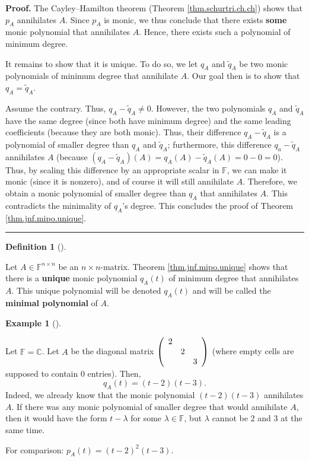 \documentclass[numbers=enddot,12pt,final,onecolumn,notitlepage]{scrartcl}%
\numberwithin{exer}{subsection}
\theoremstyle{definition}
\newtheorem{defi}[theo]{Definition}
\newenvironment{definition}[1][]
{\begin{defi}[#1]\begin{leftbar}}
{\end{leftbar}\end{defi}}
\newtheorem{exam}[theo]{Example}
\newenvironment{example}[1][]
{\begin{exam}[#1]\begin{leftbar}}
{\end{leftbar}\end{exam}}
\newenvironment{proof}[1][Proof]{\noindent\textbf{#1.} }{\ \rule{0.5em}{0.5em}}
\begin{document}
\begin{proof}
The Cayley--Hamilton theorem (Theorem \ref{thm.schurtri.ch.ch}) shows that
$p_{A}$ annihilates $A$. Since $p_{A}$ is monic, we thus conclude that there
exists \textbf{some} monic polynomial that annihilates $A$. Hence, there
exists such a polynomial of minimum degree.

It remains to show that it is unique. To do so, we let $q_{A}$ and
$\widetilde{q}_{A}$ be two monic polynomials of minimum degree that annihilate
$A$. Our goal then is to show that $q_{A}=\widetilde{q}_{A}$.

Assume the contrary. Thus, $q_{A}-\widetilde{q}_{A}\neq0$. However, the two
polynomials $q_{A}$ and $\widetilde{q}_{A}$ have the same degree (since both
have minimum degree) and the same leading coefficients (because they are both
monic). Thus, their difference $q_{A}-\widetilde{q}_{A}$ is a polynomial of
smaller degree than $q_{A}$ and $\widetilde{q}_{A}$; furthermore, this
difference $q_{a}-\widetilde{q}_{A}$ annihilates $A$ (because $\left(
q_{A}-\widetilde{q}_{A}\right)  \left(  A\right)  =q_{A}\left(  A\right)
-\widetilde{q}_{A}\left(  A\right)  =0-0=0$). Thus, by scaling this difference
by an appropriate scalar in $\mathbb{F}$, we can make it monic (since it is
nonzero), and of course it will still annihilate $A$. Therefore, we obtain a
monic polynomial of smaller degree than $q_{A}$ that annihilates $A$. This
contradicts the minimality of $q_{A}$'s degree. This concludes the proof of
Theorem \ref{thm.jnf.mipo.unique}.
\end{proof}

\begin{definition}
\label{def.jnf.mipo.mipo}Let $A\in\mathbb{F}^{n\times n}$ be an $n\times
n$-matrix. Theorem \ref{thm.jnf.mipo.unique} shows that there is a
\textbf{unique} monic polynomial $q_{A}\left(  t\right)  $ of minimum degree
that annihilates $A$. This unique polynomial will be denoted $q_{A}\left(
t\right)  $ and will be called the \textbf{minimal polynomial} of $A$.
\end{definition}

\begin{example}
Let $\mathbb{F}=\mathbb{C}$. Let $A$ be the diagonal matrix $\left(
\begin{array}
[c]{ccc}%
2 &  & \\
& 2 & \\
&  & 3
\end{array}
\right)  $ (where empty cells are supposed to contain $0$ entries). Then,%
\[
q_{A}\left(  t\right)  =\left(  t-2\right)  \left(  t-3\right)  .
\]
Indeed, we already know that the monic polynomial $\left(  t-2\right)  \left(
t-3\right)  $ annihilates $A$. If there was any monic polynomial of smaller
degree that would annihilate $A$, then it would have the form $t-\lambda$ for
some $\lambda\in\mathbb{F}$, but $\lambda$ cannot be $2$ and $3$ at the same time.

For comparison: $p_{A}\left(  t\right)  =\left(  t-2\right)  ^{2}\left(
t-3\right)  $.
\end{example}
\end{document}
